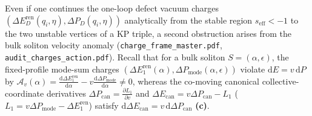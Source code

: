 \documentclass[11pt,a4paper]{article}
\newcommand{\Lc}{\textsf{\textbf{(c)}}}
\newcommand{\dd}{\mathrm{d}}
\theoremstyle{remark}
\begin{document}
Even if one continues the one-loop defect vacuum charges
$(\Delta E_D^{\mathrm{ren}}(q_i,\eta),\Delta P_D(q_i,\eta))$ analytically from
the stable region $s_{\mathrm{eff}}<-1$ to the two unstable vertices of a KP
triple, a second obstruction arises from the bulk soliton velocity anomaly
(\texttt{charge\_frame\_master.pdf}, \texttt{audit\_charges\_action.pdf}). Recall
that for a bulk soliton $S = (\alpha,\epsilon)$, the fixed-profile mode-sum
charges $(\Delta E_1^{\mathrm{ren}}(\alpha),\Delta P_{\mathrm{mode}}(\alpha,\epsilon))$
violate $\dd E = v\,\dd P$ by $\mathcal{A}_v(\alpha) = \frac{\dd\Delta E_1^{\mathrm{ren}}}{\dd\alpha} - v\frac{\dd\Delta P_{\mathrm{mode}}}{\dd\alpha} \ne 0$,
whereas the co-moving canonical collective-coordinate derivatives
$\Delta P_{\mathrm{can}} = \frac{\partial L_1}{\partial v}$ and
$\Delta E_{\mathrm{can}} = v\Delta P_{\mathrm{can}} - L_1$ ($L_1 = v\Delta P_{\mathrm{mode}}-\Delta E_1^{\mathrm{ren}}$)
satisfy $\dd\Delta E_{\mathrm{can}} = v\,\dd\Delta P_{\mathrm{can}}$ \Lc.
\end{document}
